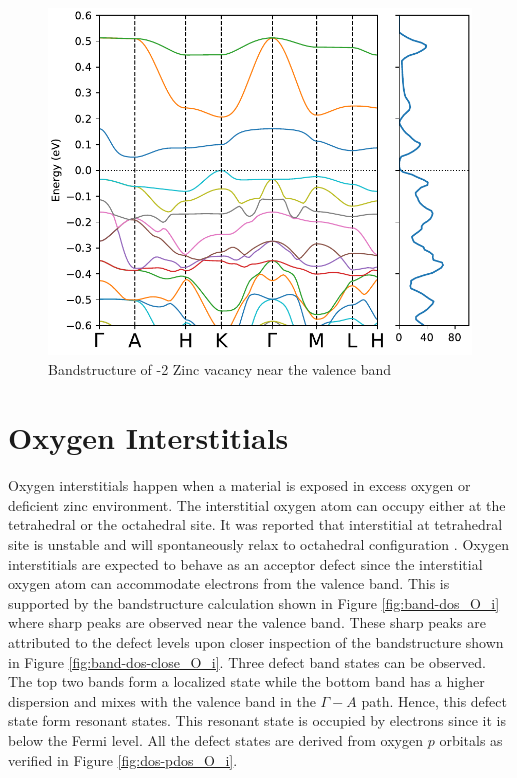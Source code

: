 \begin{figure}[tbh!]
	\centering
	\includegraphics[width=0.6\linewidth]{"images/rnd/band-dos-close_Zn_vac-n2"}
	\caption[Bandstructure of -2 Zinc vacancy near the valence band]{Bandstructure of -2 Zinc vacancy near the valence band}
	\label{fig:band-dos-close_Zn_vac-n2}
\end{figure}

\clearpage

\section{Oxygen Interstitials}
Oxygen interstitials happen when a material is exposed in excess oxygen or deficient zinc environment. The interstitial oxygen atom can occupy either at the tetrahedral or the octahedral site. It was reported that interstitial at tetrahedral site is unstable and will spontaneously relax to octahedral configuration \citep{Erhart2005}. Oxygen interstitials are expected to behave as an acceptor defect since the interstitial oxygen atom can accommodate electrons from the valence band. This is supported by the bandstructure calculation shown in Figure \ref{fig:band-dos_O_i} where sharp peaks are observed near the valence band.  These sharp peaks are attributed to the defect levels upon  closer inspection of the bandstructure shown in Figure \ref{fig:band-dos-close_O_i}. Three defect band states can be observed. The top two bands form a localized state while the bottom band has a higher dispersion and mixes with the valence band in the $\Gamma-A$ path. Hence, this defect state form resonant states. This resonant state is occupied by electrons since it is below the Fermi level. All the defect states are derived from oxygen $p$ orbitals as verified in Figure \ref{fig:dos-pdos_O_i}. 

